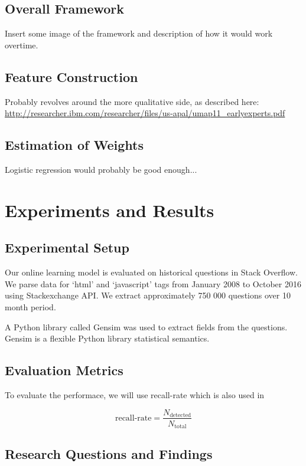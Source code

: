 \documentclass[journal,12pt,onecolumn,draftclsnofoot,]{IEEEtran}
\begin{document}
\subsection{Overall Framework}

Insert some image of the framework and description of how it would work overtime. 

\subsection{Feature Construction}

Probably revolves around the more qualitative side, as described here: 
\url{http://researcher.ibm.com/researcher/files/us-apal/umap11_earlyexperts.pdf}


\subsection{Estimation of Weights}

Logistic regression would probably be good enough...

\section{Experiments and Results}

\subsection{Experimental Setup}

Our online learning model is evaluated on historical questions in Stack Overflow. We parse data for `html' and `javascript' tags from January 2008 to October 2016 using Stackexchange API. We extract approximately 750 000 questions over 10 month period. 

A Python library called Gensim was used to extract fields from the questions. Gensim is a flexible Python library statistical semantics.

\subsection{Evaluation Metrics}

To evaluate the performace, we will use recall-rate which is also used in \cite{dupred}

$$
\text{recall-rate} = \frac{N_\text{detected}}{N_\text{total}}
$$

\subsection{Research Questions and Findings}
\end{document}
